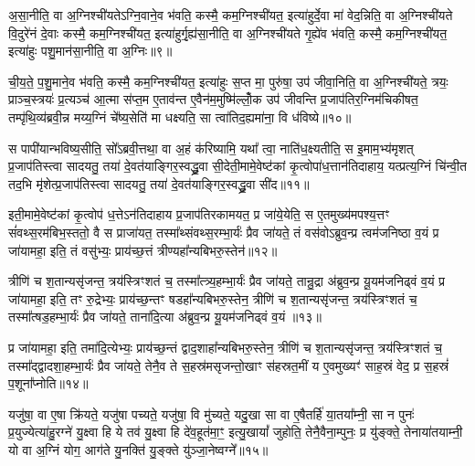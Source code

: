 अ॒सा॒नीति॒ वा अ॒ग्निश्ची॑यते\-ऽग्नि॒वाने॒व भ॑वति॒ कस्मै॒ कम॒ग्निश्ची॑यत॒ इत्या॑हुर्दे॒वा मा॑ वेद॒न्निति॒ वा अ॒ग्निश्ची॑यते वि॒दुरे॑नं दे॒वाः कस्मै॒ कम॒ग्निश्ची॑यत॒ इत्या॑हुर्गृ॒ह्य॑सा॒नीति॒ वा अ॒ग्निश्ची॑यते गृ॒ह्ये॑व भ॑वति॒ कस्मै॒ कम॒ग्निश्ची॑यत॒ इत्या॑हुः पशु॒मान॑सा॒नीति॒ वा अ॒ग्निः॥९॥

ची॒य॒ते॒ प॒शु॒माने॒व भ॑वति॒ कस्मै॒ कम॒ग्निश्ची॑यत॒ इत्या॑हुः स॒प्त मा॒ पुरु॑षा॒ उप॑ जीवा॒निति॒ वा अ॒ग्निश्ची॑यते॒ त्रयः॒ प्राञ्च॒स्त्रयः॑ प्र॒त्यञ्च॑ आ॒त्मा स॑प्त॒म ए॒ताव॑न्त ए॒वैन॑म॒मुष्मि॑ल्लोँ॒क उप॑ जीवन्ति प्र॒जाप॑तिर॒ग्निम॑चिकीषत॒ तम्पृ॑थि॒व्य॑ब्रवी॒न्न मय्य॒ग्निं चे᳚ष्य॒सेति॑ मा धक्ष्यति॒ सा त्वा॑तिद॒ह्यमा॑ना॒ वि ध॑विष्ये॥१०॥

स पापी॑यान्भविष्य॒सीति॒ सो᳚\-ऽब्रवी॒त्तथा॒ वा अ॒हं क॑रिष्यामि॒ यथा᳚ त्वा॒ नाति॑ध॒क्ष्यतीति॒ स इ॒माम॒भ्य॑मृशत् प्र॒जाप॑तिस्त्वा सादयतु॒ तया॑ दे॒वत॑याङ्गिर॒स्वद्ध्रु॒वा सी॒देती॒मामे॒वेष्ट॑कां कृ॒त्वोपा॑ध॒त्तान॑तिदाहाय॒ यत्प्रत्य॒ग्निं चि॑न्वी॒त तद॒भि मृ॑शेत्प्र॒जाप॑तिस्त्वा सादयतु॒ तया॑ दे॒वत॑याङ्गिर॒स्वद्ध्रु॒वा सी॑द॥११॥

इती॒मामे॒वेष्ट॑कां कृ॒त्वोप॑ ध॒त्ते\-ऽन॑तिदाहाय प्र॒जाप॑तिरकामयत॒ प्र जा॑ये॒येति॒ स ए॒तमुख्य॑मपश्य॒त्तꣳ सं॑वथ्स॒रम॑बिभ॒स्ततो॒ वै स प्राजा॑यत॒ तस्मा᳚थ्संवथ्स॒रम्भा॒र्यः॑ प्रैव जा॑यते॒ तं वस॑वो\-ऽब्रुव॒न्प्र त्वम॑जनिष्ठा व॒यं प्र जा॑यामहा॒ इति॒ तं वसु॑भ्यः॒ प्राय॑च्छ॒त्तं त्रीण्यहा᳚न्यबिभरु॒स्तेन॑॥१२॥

त्रीणि॑ च श॒तान्यसृ॑जन्त॒ त्रय॑स्त्रिꣳशतं च॒ तस्मा᳚त्त्र्य॒हम्भा॒र्यः॑ प्रैव जा॑यते॒ तान्रु॒द्रा अ॑ब्रुव॒न्प्र यू॒यम॑जनिढ्वं व॒यं प्र जा॑यामहा॒ इति॒ तꣳ रु॒द्रेभ्यः॒ प्राय॑च्छ॒न्तꣳ षडहा᳚न्यबिभरु॒स्तेन॒ त्रीणि॑ च श॒तान्यसृ॑जन्त॒ त्रय॑स्त्रिꣳशतं च॒ तस्मा᳚त्षड॒हम्भा॒र्यः॑ प्रैव जा॑यते॒ ताना॑दि॒त्या अ॑ब्रुव॒न्प्र यू॒यम॑जनिढ्वं व॒यं ॥१३॥

प्र जा॑यामहा॒ इति॒ तमा॑दि॒त्येभ्यः॒ प्राय॑च्छ॒न्तं द्वाद॒शाहा᳚न्यबिभरु॒स्तेन॒ त्रीणि॑ च श॒तान्यसृ॑जन्त॒ त्रय॑स्त्रिꣳशतं च॒ तस्मा᳚द्द्वादशा॒हम्भा॒र्यः॑ प्रैव जा॑यते॒ तेनै॒व ते स॒हस्र॑मसृजन्तो॒खाꣳ स॑हस्रत॒मीं य ए॒वमुख्यꣳ॑ साह॒स्रं वेद॒ प्र स॒हस्रं॑ प॒शूना᳚प्नोति॥१४॥

{\anuvakamend[{अ॒ग्नि॒वान्प॑शु॒मान॑सा॒नीति॒ वा अ॒ग्निर्ध॑विष्ये मृशेत्प्र॒जाप॑तिस्त्वा सादयतु॒ तया॑ दे॒वत॑याङ्गिर॒स्वद्ध्रु॒वा सी॑द॒ तेन॒ ताना॑दि॒त्या अ॑ब्रुव॒न्प्र यू॒यम॑जनिढ्वं व॒यञ्च॑त्वारि॒ꣳ॒शच्च॑॥२॥}]}

यजु॑षा॒ वा ए॒षा क्रि॑यते॒ यजु॑षा पच्यते॒ यजु॑षा॒ वि मु॑च्यते॒ यदु॒खा सा वा ए॒षैतर्\mbox{}हि॑ या॒तया᳚म्नी॒ सा न पुनः॑ प्र॒युज्येत्या॑हु॒रग्ने॑ यु॒क्ष्वा हि ये तव॑ यु॒क्ष्वा हि दे॑व॒हूत॑मा॒ꣳ॒ इत्यु॒खायां᳚ जुहोति॒ तेनै॒वैना॒म्पुनः॒ प्र यु॑ङ्क्ते॒ तेनाया॑तयाम्नी॒ यो वा अ॒ग्निं योग॒ आग॑ते यु॒नक्ति॑ यु॒ङ्क्ते यु॑ञ्जा॒नेष्वग्ने᳚॥१५॥

